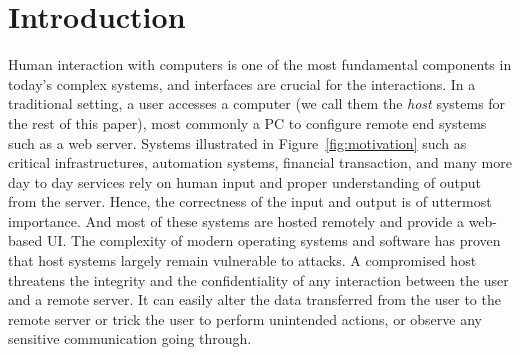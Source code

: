 \section{Introduction}
\label{sec:intro}

Human interaction with computers is one of the most fundamental components in today's complex systems, and interfaces are crucial for the interactions. In a traditional setting, a user accesses a computer (we call them the \emph{host} systems for the rest of this paper), most commonly a PC to configure remote end systems such as a web server. Systems illustrated in Figure~\ref{fig:motivation} such as critical infrastructures, automation systems, financial transaction, and many more day to day services rely on human input and proper understanding of output from the server. Hence, the correctness of the input and output is of uttermost importance. And most of these systems are hosted remotely and provide a web-based UI. The complexity of modern operating systems and software has proven that host systems largely remain vulnerable to attacks. A compromised host threatens the integrity and the confidentiality of any interaction between the user and a remote server. It can easily alter the data transferred from the user to the remote server or trick the user to perform unintended actions, or observe any sensitive communication going through.


